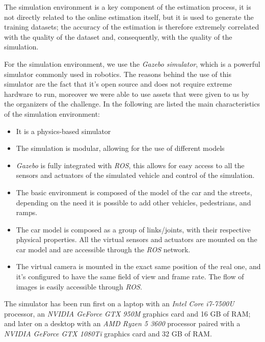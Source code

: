 \documentclass[a4paper,12pt,sort&compress]{article}
\begin{document}
    The simulation environment is a key component of the estimation process, it
    is not directly related to the online estimation itself, but it is used to
    generate the training datasets; the accuracy of the estimation is therefore
    extremely correlated with the quality of the dataset and, consequently, with
    the quality of the simulation. 

    For the simulation environment, we use the \textit{Gazebo
    simulator}\citep*{1389727}, which is a powerful simulator commonly used in
    robotics. The reasons behind the use of this simulator are the fact that
    it's open source and does not require extreme hardware to run, moreover we
    were able to use assets that were given to us by the organizers of the
    challenge. In the following are listed the main characteristics of the
    simulation environment:
    \begin{itemize}
        \item It is a physics-based simulator
        \item The simulation is modular, allowing for the use of different
        models 
        \item \textit{Gazebo} is fully integrated with \textit{ROS}, this allows
        for easy access to all the sensors and actuators of the simulated
        vehicle and control of the simulation.
        \item The basic environment is composed of the model of the car and the
        streets, depending on the need it is possible to add other vehicles,
        pedestrians, and ramps.
        \item The car model is composed as a group of links/joints, with their
        respective physical properties. All the virtual sensors and actuators are
        mounted on the car model and are accessible through the \textit{ROS} network.
        \item The virtual camera is mounted in the exact same position of the
        real one, and it's configured to have the same field of view and frame
        rate. The flow of images is easily accessible through \textit{ROS}.
    \end{itemize}

    The simulator has been run first on a laptop with an \textit{Intel Core i7-7500U}
    processor, an \textit{NVIDIA GeForce GTX 950M} graphics card and 16 GB of
    RAM; and later on a desktop with an \textit{AMD Ryzen 5 3600} processor paired with a
    \textit{NVIDIA GeForce GTX 1080Ti} graphics card and 32 GB of RAM.  
    
\end{document}
